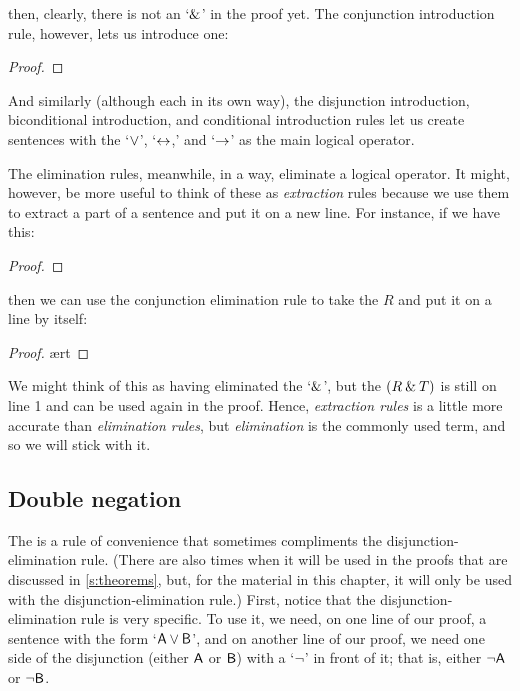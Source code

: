 \noindent then, clearly, there is not an `$\mathbin{\&}$' in the proof yet. The conjunction introduction rule, however, lets us introduce one:

\begin{proof}
	 
\end{proof}

\noindent And similarly (although each in its own way), the disjunction introduction, biconditional introduction, and conditional introduction rules let us create sentences with the `$\vee$', `$\leftrightarrow$,' and `$\rightarrow$' as the main logical operator.

The elimination rules, meanwhile, in a way, eliminate a logical operator. It might, however, be more useful to think of these as \textit{extraction} rules because we use them to extract a part of a sentence and put it on a new line. For instance, if we have this:

\begin{proof}
	 \pr{}
\end{proof}

\noindent then we can use the conjunction elimination rule to take the $R$ and put it on a line by itself:

\begin{proof}
	 \ae{rt}
\end{proof}

\noindent We might think of this as having eliminated the `$\mathbin{\&}$', but the $(R \mathbin{\&} T)$ is still on line 1 and can be used again in the proof. Hence, \textit{extraction rules} is a little more accurate than \textit{elimination rules}, but \textit{elimination} is the commonly used term, and so we will stick with it. 


\subsection{Double negation}\label{subsection-DN}

The  is a rule of convenience that sometimes compliments the disjunction-elimination rule. (There are also times when it will be used in the proofs that are discussed in \ref{s:theorems}, but, for the material in this chapter, it will only be used with the disjunction-elimination rule.) First, notice that the disjunction-elimination rule is very specific. To use it, we need, on one line of our proof, a sentence with the form `$\mathsf{A}\vee\mathsf{B}$', and on another line of our proof, we need one side of the disjunction (either $\mathsf{A}$ or $\mathsf{B}$) with a `${\neg}$' in front of it; that is, either ${\neg}\mathsf{A}$ or ${\neg}\mathsf{B}$. 

